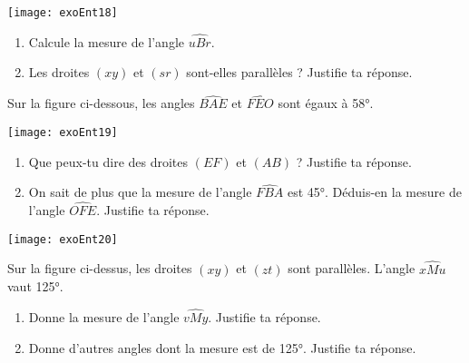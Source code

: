 \begin{exercice}

\begin{center}
    \texttt{[image: exoEnt18]}
\end{center}

\begin{enumerate}
\item Calcule la mesure de l'angle $\widehat{uBr}$.
\item Les droites $(xy)$ et $(sr)$ sont-elles parallèles ? Justifie ta réponse.
\end{enumerate}
\end{exercice}



\columnbreak
{}





\begin{exercice}[Parallèles ?]
Sur la figure ci-dessous, les angles $\widehat{BAE}$ et $\widehat{FEO}$ sont égaux à 58°.

\begin{center}
    \texttt{[image: exoEnt19]}
\end{center}

\begin{enumerate}
\item Que peux-tu dire des droites $(EF)$ et $(AB)$ ? Justifie ta réponse.
\item On sait de plus que la mesure de l'angle $\widehat{FBA}$ est 45°. Déduis-en la mesure de l'angle $\widehat{OFE}$. Justifie ta réponse.
\end{enumerate}
\end{exercice}


\begin{exercice}

\begin{center}
    \texttt{[image: exoEnt20]}
\end{center}

Sur la figure ci-dessus, les droites $(xy)$ et $(zt)$ sont parallèles. L'angle $\widehat{xMu}$ vaut 125°.
\begin{enumerate}
\item Donne la mesure de l'angle $\widehat{vMy}$. Justifie ta réponse.
\item Donne d'autres angles dont la mesure est de 125°. Justifie ta réponse.
\end{enumerate}
\end{exercice}

